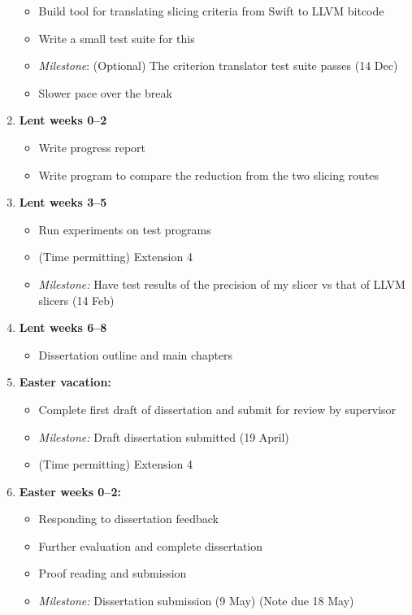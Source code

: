 \begin{enumerate}
  \begin{itemize}
  \tightlist
  \item
    Build tool for translating slicing criteria from Swift to LLVM
    bitcode
  \item
    Write a small test suite for this
  \item
    \emph{Milestone}: (Optional) The criterion translator test suite
    passes (14 Dec)
  \item
    Slower pace over the break
  \end{itemize}
\item
  \textbf{Lent weeks 0--2}

  \begin{itemize}
  \tightlist
  \item
    Write progress report
  \item
    Write program to compare the reduction from the two slicing routes
  \end{itemize}
\item
  \textbf{Lent weeks 3--5}

  \begin{itemize}
  \tightlist
  \item
    Run experiments on test programs
  \item
    (Time permitting) Extension 4
  \item
    \emph{Milestone:} Have test results of the precision of my slicer vs
    that of LLVM slicers (14 Feb)
  \end{itemize}
\item
  \textbf{Lent weeks 6--8}

  \begin{itemize}
  \tightlist
  \item
    Dissertation outline and main chapters
  \end{itemize}
\item
  \textbf{Easter vacation:}

  \begin{itemize}
  \tightlist
  \item
    Complete first draft of dissertation and submit for review by
    supervisor
  \item
    \emph{Milestone:} Draft dissertation submitted (19 April)
  \item
    (Time permitting) Extension 4
  \end{itemize}
\item
  \textbf{Easter weeks 0--2:}

  \begin{itemize}
  \tightlist
  \item
    Responding to dissertation feedback
  \item
    Further evaluation and complete dissertation
  \item
    Proof reading and submission
  \item
    \emph{Milestone:} Dissertation submission (9 May) (Note due 18 May)
  \end{itemize}
\end{enumerate}

